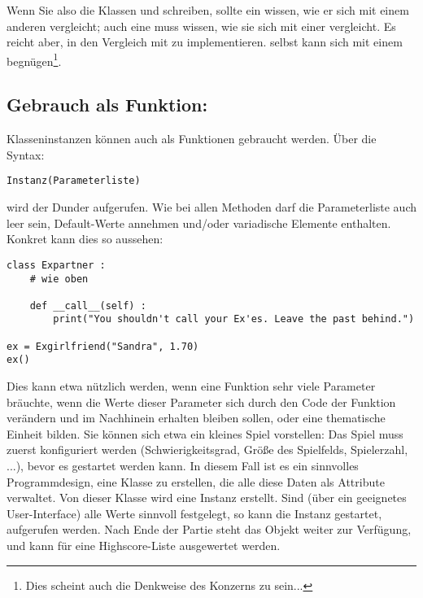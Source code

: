 Wenn Sie also die Klassen  und  schreiben, sollte ein  wissen, wie er sich mit einem anderen  vergleicht; auch eine  muss wissen, wie sie sich mit einer  vergleicht. Es reicht aber, in  den Vergleich mit  zu implementieren.  selbst kann sich mit einem  begnügen\footnote{Dies scheint auch die Denkweise des Konzerns zu sein...}.

\subsection{Gebrauch als Funktion: }
Klasseninstanzen können auch als Funktionen gebraucht werden. Über die Syntax:
\begin{codebox}
\begin{verbatim}
Instanz(Parameterliste)
\end{verbatim}
\end{codebox}

wird der Dunder  aufgerufen. Wie bei allen Methoden darf die Parameterliste auch leer sein, Default-Werte annehmen und/oder variadische Elemente enthalten. Konkret kann dies so aussehen:

\begin{codebox}
\begin{verbatim}
class Expartner :
    # wie oben
    
    def __call__(self) :
        print("You shouldn't call your Ex'es. Leave the past behind.")

ex = Exgirlfriend("Sandra", 1.70)
ex()
\end{verbatim}
\end{codebox}

Dies kann etwa nützlich werden, wenn eine Funktion sehr viele Parameter bräuchte, wenn die Werte dieser Parameter sich durch den Code der Funktion verändern und im Nachhinein erhalten bleiben sollen, oder eine thematische Einheit bilden. Sie können sich etwa ein kleines Spiel vorstellen: Das Spiel muss zuerst konfiguriert werden (Schwierigkeitsgrad, Größe des Spielfelds, Spielerzahl, ...), bevor es gestartet werden kann. In diesem Fall ist es ein sinnvolles Programmdesign, eine Klasse  zu erstellen, die alle diese Daten als Attribute verwaltet. Von dieser Klasse wird eine Instanz  erstellt. Sind (\eg über ein geeignetes User-Interface) alle Werte sinnvoll festgelegt, so kann die Instanz  gestartet, \ie aufgerufen werden. Nach Ende der Partie steht das Objekt  weiter zur Verfügung, und kann \eg für eine Highscore-Liste ausgewertet werden.

